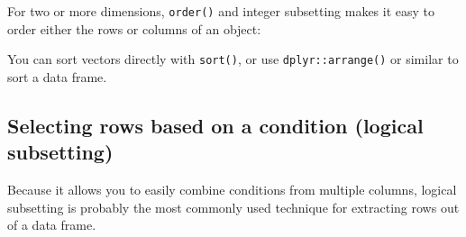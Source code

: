 \documentclass[]{book}
\newenvironment{Shaded}{\begin{snugshade}}{\end{snugshade}}
\newcommand{\KeywordTok}[1]{\textcolor[rgb]{0.13,0.29,0.53}{\textbf{#1}}}
\newcommand{\DataTypeTok}[1]{\textcolor[rgb]{0.13,0.29,0.53}{#1}}
\newcommand{\DecValTok}[1]{\textcolor[rgb]{0.00,0.00,0.81}{#1}}
\newcommand{\StringTok}[1]{\textcolor[rgb]{0.31,0.60,0.02}{#1}}
\newcommand{\CommentTok}[1]{\textcolor[rgb]{0.56,0.35,0.01}{\textit{#1}}}
\newcommand{\OperatorTok}[1]{\textcolor[rgb]{0.81,0.36,0.00}{\textbf{#1}}}
\newcommand{\NormalTok}[1]{#1}
\theoremstyle{definition}
\theoremstyle{definition}
\theoremstyle{definition}
\theoremstyle{remark}
\begin{document}
For two or more dimensions, \texttt{order()} and integer subsetting
makes it easy to order either the rows or columns of an object:

\begin{Shaded}
\end{Shaded}

You can sort vectors directly with \texttt{sort()}, or use
\texttt{dplyr::arrange()} or similar to sort a data frame.

\subsection{Selecting rows based on a condition (logical
subsetting)}\label{selecting-rows-based-on-a-condition-logical-subsetting}

Because it allows you to easily combine conditions from multiple
columns, logical subsetting is probably the most commonly used technique
for extracting rows out of a data frame.
\end{document}
